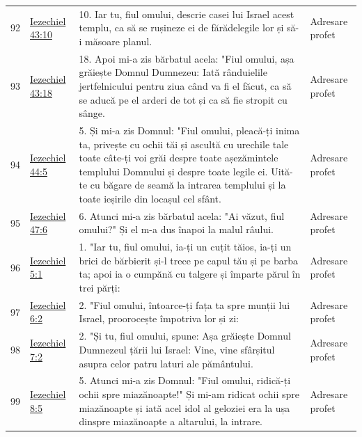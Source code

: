 \documentclass[12pt,a4paper,twoside,openany]{book}
\begin{document}
\begin{longtable}{L{0.8cm}L{1.2cm}L{11.9cm}L{0.8cm}}
92 & \href{https://bibliaortodoxa.ro/carte.php?id=33\&cap=43\#10}{Iezechiel 43:10} & 10. Iar tu, fiul omului, descrie casei lui Israel acest templu, ca să se rușineze ei de fărădelegile lor și să-i măsoare planul. & Adresare profet \\
93 & \href{https://bibliaortodoxa.ro/carte.php?id=33\&cap=43\#18}{Iezechiel 43:18} & 18. Apoi mi-a zis bărbatul acela: "Fiul omului, așa grăiește Domnul Dumnezeu: Iată rânduielile jertfelnicului pentru ziua când va fi el făcut, ca să se aducă pe el arderi de tot și ca să fie stropit cu sânge. & Adresare profet \\
94 & \href{https://bibliaortodoxa.ro/carte.php?id=33\&cap=44\#5}{Iezechiel 44:5} & 5. Și mi-a zis Domnul: "Fiul omului, pleacă-ți inima ta, privește cu ochii tăi și ascultă cu urechile tale toate câte-ți voi grăi despre toate așezămintele templului Domnului și despre toate legile ei. Uită-te cu băgare de seamă la intrarea templului și la toate ieșirile din locașul cel sfânt. & Adresare profet \\
95 & \href{https://bibliaortodoxa.ro/carte.php?id=33\&cap=47\#6}{Iezechiel 47:6} & 6. Atunci mi-a zis bărbatul acela: "Ai văzut, fiul omului?" Și el m-a dus înapoi la malul râului. & Adresare profet \\
96 & \href{https://bibliaortodoxa.ro/carte.php?id=33\&cap=5\#1}{Iezechiel 5:1} & 1. "Iar tu, fiul omului, ia-ți un cuțit tăios, ia-ți un brici de bărbierit și-l trece pe capul tău și pe barba ta; apoi ia o cumpănă cu talgere și împarte părul în trei părți: & Adresare profet \\
97 & \href{https://bibliaortodoxa.ro/carte.php?id=33\&cap=6\#2}{Iezechiel 6:2} & 2. "Fiul omului, întoarce-ți fața ta spre munții lui Israel, proorocește împotriva lor și zi: & Adresare profet \\
98 & \href{https://bibliaortodoxa.ro/carte.php?id=33\&cap=7\#2}{Iezechiel 7:2} & 2. "Și tu, fiul omului, spune: Așa grăiește Domnul Dumnezeul țării lui Israel: Vine, vine sfârșitul asupra celor patru laturi ale pământului. & Adresare profet \\
99 & \href{https://bibliaortodoxa.ro/carte.php?id=33\&cap=8\#5}{Iezechiel 8:5} & 5. Atunci mi-a zis Domnul: "Fiul omului, ridică-ți ochii spre miazănoapte!" Și mi-am ridicat ochii spre miazănoapte și iată acel idol al geloziei era la ușa dinspre miazănoapte a altarului, la intrare. & Adresare profet \\

\end{longtable}
\end{document}
